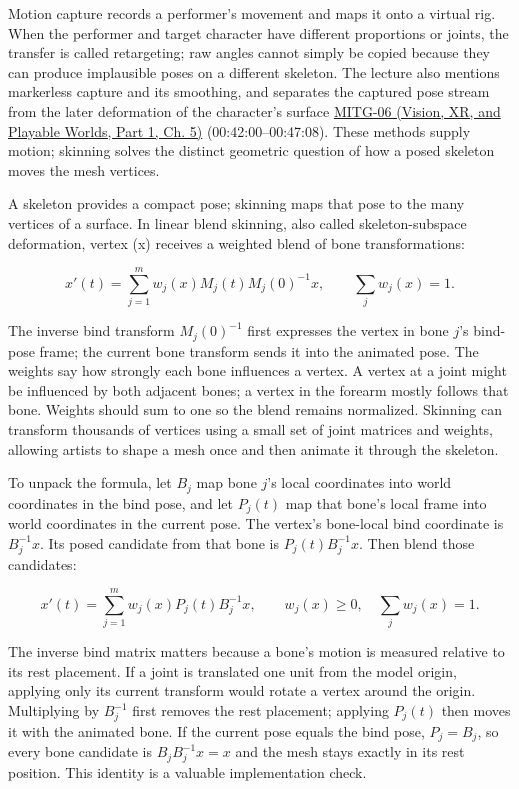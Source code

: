 Motion capture records a performer's movement and maps it onto a virtual rig. When the performer and target character have different proportions or joints, the transfer is called retargeting; raw angles cannot simply be copied because they can produce implausible poses on a different skeleton. The lecture also mentions markerless capture and its smoothing, and separates the captured pose stream from the later deformation of the character's surface \href{../07-Vision-XR-and-Playable-Worlds-P01/main.pdf\#nameddest=04-visual-computing-ii-ch036-mitg-06---animation-skinningenveloping}{MITG-06 (Vision, XR, and Playable Worlds, Part 1, Ch. 5)} (00:42:00--00:47:08). These methods supply motion; skinning solves the distinct geometric question of how a posed skeleton moves the mesh vertices.

A skeleton provides a compact pose; skinning maps that pose to the many vertices of a surface. In linear blend skinning, also called skeleton-subspace deformation, vertex (x) receives a weighted blend of bone transformations:

\[
x'(t)=\sum_{j=1}^{m}w_j(x)M_j(t)M_j(0)^{-1}x,\qquad \sum_j w_j(x)=1.
\]

The inverse bind transform \(M_j(0)^{-1}\) first expresses the vertex in bone \(j\)'s bind-pose frame; the current bone transform sends it into the animated pose. The weights say how strongly each bone influences a vertex. A vertex at a joint might be influenced by both adjacent bones; a vertex in the forearm mostly follows that bone. Weights should sum to one so the blend remains normalized. Skinning can transform thousands of vertices using a small set of joint matrices and weights, allowing artists to shape a mesh once and then animate it through the skeleton.

To unpack the formula, let \(B_j\) map bone \(j\)'s local coordinates into world coordinates in the bind pose, and let \(P_j(t)\) map that bone's local frame into world coordinates in the current pose. The vertex's bone-local bind coordinate is \(B_j^{-1}x\). Its posed candidate from that bone is \(P_j(t)B_j^{-1}x\). Then blend those candidates:

\[
x'(t)=\sum_{j=1}^{m}w_j(x)P_j(t)B_j^{-1}x,\qquad
w_j(x)\ge0,\quad\sum_jw_j(x)=1.
\]

The inverse bind matrix matters because a bone's motion is measured relative to its rest placement. If a joint is translated one unit from the model origin, applying only its current transform would rotate a vertex around the origin. Multiplying by \(B_j^{-1}\) first removes the rest placement; applying \(P_j(t)\) then moves it with the animated bone. If the current pose equals the bind pose, \(P_j=B_j\), so every bone candidate is \(B_jB_j^{-1}x=x\) and the mesh stays exactly in its rest position. This identity is a valuable implementation check.


